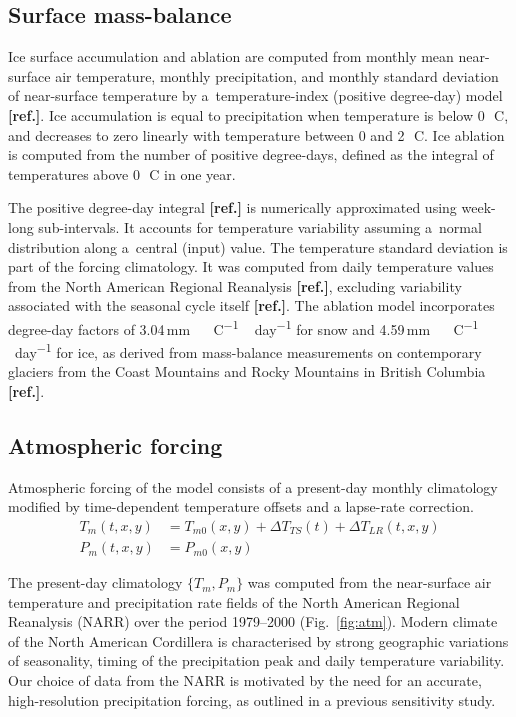 \documentclass[tc, ms]{copernicus}
\newcommand{\aref}[0]{\textbf{[ref.]}}
\renewcommand{\citep}[1]{\aref}
\renewcommand{\citet}[1]{\aref}
\begin{document}
\subsection{Surface mass-balance}

Ice surface accumulation and ablation are computed from monthly mean
near-surface air temperature, monthly precipitation, and monthly standard
deviation of near-surface temperature by a~temperature-index (positive
degree-day) model \citep{hock-2003}. Ice accumulation is equal to precipitation
when temperature is below 0\,\unit{{\degree}C}, and decreases to zero linearly
with temperature between 0 and 2\,\unit{{\degree}C}. Ice ablation is computed
from the number of positive degree-days, defined as the integral of
temperatures above 0\,\unit{{\degree}C} in one year.

The positive degree-day integral \citep{calov-greve-2005} is numerically
approximated using week-long sub-intervals. It accounts for temperature
variability assuming a~normal distribution along a~central (input) value. The
temperature standard deviation is part of the forcing climatology. It was
computed from daily temperature values from the North American Regional
Reanalysis \citep{data:narr}, excluding variability associated with the
seasonal cycle itself \citet{seguinot-rogozhina-2014}. The
ablation model incorporates degree-day factors of
3.04\,\unit{mm\,{\degree}C^{-1}\,day^{-1}} for snow and
4.59\,\unit{mm\,{\degree}C^{-1}\,day^{-1}} for ice, as derived from
mass-balance measurements on contemporary glaciers from the Coast Mountains and
Rocky Mountains in British Columbia \citep{shea-etal-2009}.

\subsection{Atmospheric forcing}

Atmospheric forcing of the model consists of a present-day monthly climatology
modified by time-dependent temperature offsets and a lapse-rate correction.
\begin{align}
    T_m(t, x, y) &= T_{m0}(x, y) + {\Delta}T_{TS}(t) + {\Delta}T_{LR}(t, x, y) \\
    P_m(t, x, y) &= P_{m0}(x, y)
\end{align}

The present-day climatology $\{T_m, P_m\}$ was computed from the near-surface air temperature and
precipitation rate fields of the North American Regional Reanalysis (NARR) over
the period 1979--2000 (Fig.~\ref{fig:atm}). Modern climate of the North
American Cordillera is characterised by strong geographic variations of
seasonality, timing of the precipitation peak and daily temperature variability.
Our choice of data from the NARR is motivated by the need for an accurate,
high-resolution precipitation forcing, as outlined in a previous sensitivity
study.
\end{document}
